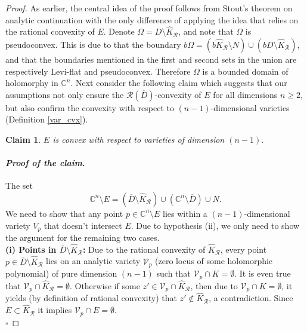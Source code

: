 \documentclass[12pt,reqno, a4paper]{amsart}
\newtheorem{claim}[theorem]{Claim}
\theoremstyle{definition}
\newenvironment{claimproof}{\paragraph{\textit{Proof of the claim}.}}{\hfill$\square$}
\theoremstyle{definition}
\numberwithin{equation}{section}
\def\C{\mathbb{C}}                              %
\begin{document}
\begin{proof}
As earlier, the central idea of the proof follows from Stout's theorem on analytic continuation with the only difference of applying the idea that relies on the rational convexity of $E$.
Denote $\Omega=D\setminus \widehat{K}_{\mathcal{R}}$, and note that $\Omega$ is pseudoconvex. This is due to that the boundary $b \Omega= (b\widehat{K}_{\mathcal{R}}\setminus N) \cup (b D \setminus \widehat{K}_{\mathcal{R}})$, and that the boundaries mentioned in the first and second sets in the union are respectively Levi-flat and pseudoconvex. Therefore $\Omega$ is a bounded domain of holomorphy in $\C^n.$ Next consider the following claim which suggests that our assumptions not only ensure the $\mathcal{R}(\overline{D})$-convexity of $E$ for all dimensions $n\geq 2$, but also confirm the convexity with respect to $(n-1)$-dimensional varieties (Definition \ref{var_cvx}). 
	
	\begin{claim}\label{claim_var_dim_n-1}
	$E$ is convex with respect to varieties of dimension $(n-1).$
	\end{claim}
	
	\begin{claimproof}
The set $$\C^n\setminus E= (\overline{D}\setminus \widehat{K}_{\mathcal{R}}) \cup (\C^n\setminus \overline{D})\cup N.$$ We need to show that any point $p\in \C^n\setminus E$ lies within a $(n-1)$-dimensional variety $V_p$ that doesn't intersect $E.$ Due to hypothesis (ii), we only need to show the argument for the remaining two cases. \\

  \noindent\textbf{(i) Points in  $\overline{D}\setminus \widehat{K}_{\mathcal{R}}$:} 
  Due to the rational convexity of $\widehat{K}_{\mathcal{R}}$, every point $p\in  \overline{D}\setminus \widehat{K}_{\mathcal{R}}$ lies on an analytic variety $\mathcal{V}_p$ (zero locus of some holomorphic polynomial) of pure dimension $(n-1)$ 
 such that $\mathcal{V}_p\cap K=\emptyset$. It is even true that $\mathcal{V}_p\cap \widehat{K}_{\mathcal{R}}=\emptyset.$ Otherwise if some $z'\in \mathcal{V}_p\cap \widehat{K}_{\mathcal{R}}$, then due to $\mathcal{V}_p\cap K=\emptyset$, it yields (by definition of rational convexity) that $z'\notin \widehat{K}_{\mathcal{R}}$, a contradiction. Since $E\subset \widehat{K}_{\mathcal{R}}$ it implies $\mathcal{V}_p\cap E=\emptyset$. \\
 


\end{claimproof}
\end{proof}
\end{document}
